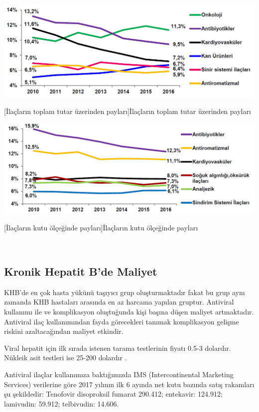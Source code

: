 \begin{minipage}{0.49\textwidth}
 \begin{center}
 	\includegraphics[width=1\linewidth, height=0.15\textheight]{../Figures/eko1}
 	\end{center}
 	  [İlaçların toplam tutar üzerinden payları]{İlaçların toplam tutar üzerinden payları \cite{sektor17}}
 	  \label{fig:eko1}	
\end{minipage}
\begin{minipage}{0.49\textwidth}
	\begin{center}
	\includegraphics[width=1\linewidth, height=0.15\textheight]{../Figures/eko2}
	\end{center}
	  [İlaçların kutu ölçeğinde payları]{İlaçların kutu ölçeğinde payları \cite{sektor17}}
	  \label{fig:eko2}
\end{minipage}\\



\subsection{Kronik Hepatit B'de Maliyet}

KHB'de en çok hasta yükünü taşıyıcı grup oluşturmaktadır fakat bu grup aynı zamanda KHB hastaları arasında en az harcama yapılan gruptur. Antiviral kullanımı ile ve komplikasyon oluştuğunda kişi başına düşen maliyet artmaktadır. Antiviral ilaç kullanımından fayda görecekleri tanımak komplikasyon gelişme riskini azaltacağından maliyet etkindir. 

Viral hepatit için ilk sırada istenen tarama testlerinin fiyatı 0.5-3 dolardır. Nükleik asit testleri ise 25-200 dolardır \cite{world2017global}. 

Antiviral ilaçlar kullanımıza baktığımızda IMS (Intercontinental Marketing Services) verilerine göre  2017 yılının ilk 6 ayında net kutu bazında satış rakamları şu şekildedir: Tenofovir disoproksil fumarat 290.412; entekavir: 124.912; lamivudin: 59.912; telbivudin: 14.606.  


